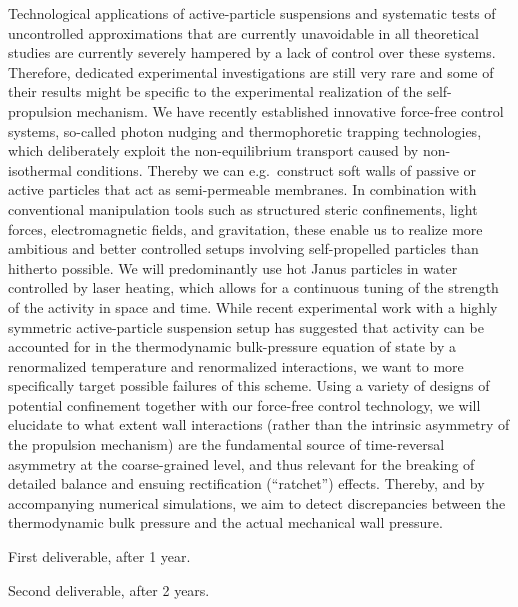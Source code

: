 \begin{workpackage}[id=WPactive,wphases=0-48,
  short=Active Particle Suspensions,%
  title=Probing Active Particle Suspensions with Colloids and Polymers,
  lead=Leipzig,
  LeipzigRM=12]
\begin{tasklist}
\begin{task}[title=Active-Particle Suspensions,id=task2,PM=15,lead=Leipzig,wphases=12-42!0.5]
Technological applications of active-particle suspensions and systematic tests of
uncontrolled approximations that are currently unavoidable in all theoretical studies are
currently severely hampered by a lack of control over these systems.
%
Therefore, dedicated experimental investigations are still very rare and some of their
results might be specific to the experimental realization of the self-propulsion mechanism.
We have recently established innovative force-free control systems, so-called photon nudging
and thermophoretic trapping technologies, which deliberately exploit the non-equilibrium
transport caused by non-isothermal conditions.
%
Thereby we can e.g.\ construct soft walls of passive or active particles that act as
semi-permeable membranes.
%
In combination with conventional manipulation tools such as structured steric confinements,
light forces, electromagnetic fields, and gravitation, these enable us to realize more
ambitious and better controlled setups involving self-propelled particles than hitherto
possible.
%
We will predominantly use hot Janus particles in water controlled by laser heating, which
allows for a continuous tuning of the strength of the activity in space and time.
%
While recent experimental work with a highly symmetric active-particle suspension setup has
suggested that activity can be accounted for in the thermodynamic bulk-pressure equation of
state by a renormalized temperature and renormalized interactions, we want to more
specifically target possible failures of this scheme.
%
Using a variety of designs of potential confinement together with our force-free control
technology, we will elucidate to what extent wall interactions (rather than the intrinsic
asymmetry of the propulsion mechanism) are the fundamental source of time-reversal asymmetry
at the coarse-grained level, and thus relevant for the breaking of detailed balance and
ensuing rectification (``ratchet'') effects.
%
Thereby, and by accompanying numerical simulations, we aim to detect discrepancies between
the thermodynamic bulk pressure and the actual mechanical wall pressure.
\end{task}


\end{tasklist}

\begin{wpdelivs}
  \begin{wpdeliv}[due=12,id=mydeliv1,dissem=PU,nature=DEM,lead=Leipzig]
      {First deliverable, after 1 year.}
  \end{wpdeliv}
  \begin{wpdeliv}[due=24,id=mydeliv2,dissem=PU,nature=DEM,lead=Leipzig]
      {Second deliverable, after 2 years.}
\end{wpdeliv}
\end{wpdelivs}

\end{workpackage}
